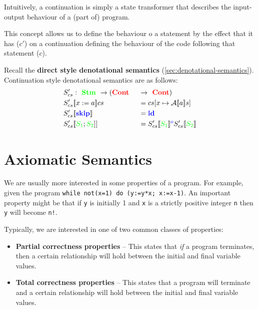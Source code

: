 \documentclass[11pt,a4paper,headsepline,titlepage,dvipsnames,cmyk]{scrartcl}
\begin{document}
Intuitively, a continuation is simply a state transformer that describes
the input-output behaviour of a (part of) program.

This concept allows us to define the behaviour o a statement  by the
effect that it has ($c'$) on a continuation defining the behaviour of the
code following that statement ($c$).

Recall the \textbf{direct style denotational semantics}
(\ref{sec:denotational-semantics}). Continuation style denotational
semantics are as follows:
\begin{alignat*}{2}
    &S'_{cs} : {\color{green}\textbf{ Stm }} \rightarrow (
    {\color{red}\textbf{Cont }} &&\rightarrow {\color{red}\textbf{ Cont}}) \\
    &S'_{cs} [\![x:=a]\!]c s &&= c s [x \mapsto \mathcal{A}[\![a]\!]s] \\
    &S'_{cs} [\![ {\color{blue}\textbf{skip}}]\!] &&=
    {\color{blue}\textbf{id}} \\
    &S'_{cs}[\![ {\color{green}S_1}; {\color{green}S_2} ]] &&= S'_{cs}[\![
    {\color{green}S_1} ]\!] ^ {\color{blue}o} S'_{cs} [\![
    {\color{green}S_2} ]\!] \\
\end{alignat*}

\newpage
\section{Axiomatic Semantics}%
\label{sec:axiomatic-sem}
We are usually more interested in some properties of a program. For
example, given the program \lstinline|while not(x=1) do (y:=y*x; x:=x-1)|.
An important property might be that if \lstinline|y| is initially 1 and
\lstinline|x|  is a strictly positive integer \lstinline|n| then
\lstinline|y|  will become \lstinline|n!|.

Typically, we are interested in one of two common classes of properties:
\begin{itemize}
    \item \textbf{Partial correctness properties} -- This states that
        \textit{if} a program terminates, then a certain relationship will
        hold between the initial and final variable values.
    \item \textbf{Total correctness properties} -- This states that a
        program will terminate and a certain relationship will hold
        between the initial and final variable values.
\end{itemize}
\end{document}
